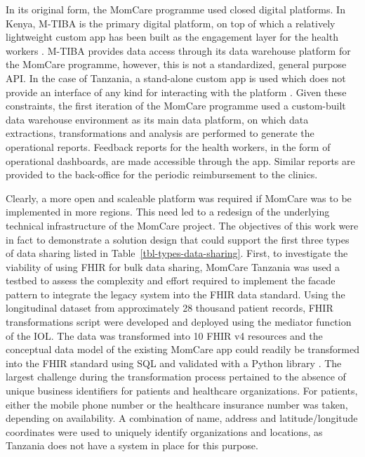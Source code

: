 \documentclass[
  authoryear]{elsarticle}
\begin{document}
In its original form, the MomCare programme used closed digital
platforms. In Kenya, M-TIBA is the primary digital platform, on top of
which a relatively lightweight custom app has been built as the
engagement layer for the health workers \citep{huisman2022digital}.
M-TIBA provides data access through its data warehouse platform for the
MomCare programme, however, this is not a standardized, general purpose
API. In the case of Tanzania, a stand-alone custom app is used which
does not provide an interface of any kind for interacting with the
platform \citep{mrema2021application}. Given these constraints, the
first iteration of the MomCare programme used a custom-built data
warehouse environment as its main data platform, on which data
extractions, transformations and analysis are performed to generate the
operational reports. Feedback reports for the health workers, in the
form of operational dashboards, are made accessible through the app.
Similar reports are provided to the back-office for the periodic
reimbursement to the clinics.

Clearly, a more open and scaleable platform was required if MomCare was
to be implemented in more regions. This need led to a redesign of the
underlying technical infrastructure of the MomCare project. The
objectives of this work were in fact to demonstrate a solution design
that could support the first three types of data sharing listed in
Table~\ref{tbl-types-data-sharing}. First, to investigate the viability
of using FHIR for bulk data sharing, MomCare Tanzania was used a testbed
to assess the complexity and effort required to implement the facade
pattern to integrate the legacy system into the FHIR data standard.
Using the longitudinal dataset from approximately 28 thousand patient
records, FHIR transformations script were developed and deployed using
the mediator function of the IOL. The data was transformed into 10 FHIR
v4 resources and the conceptual data model of the existing MomCare app
could readily be transformed into the FHIR standard using SQL and
validated with a Python library \citep{islam2023fhir}. The largest
challenge during the transformation process pertained to the absence of
unique business identifiers for patients and healthcare organizations.
For patients, either the mobile phone number or the healthcare insurance
number was taken, depending on availability. A combination of name,
address and latitude/longitude coordinates were used to uniquely
identify organizations and locations, as Tanzania does not have a system
in place for this purpose.
\end{document}
